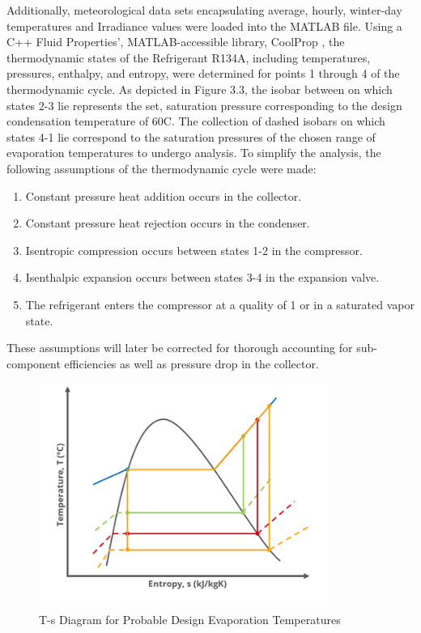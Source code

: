 \medskip
Additionally, meteorological data sets encapsulating average, hourly, winter-day temperatures and Irradiance values were loaded into the MATLAB \cite{MATLAB} file. Using a C++ Fluid Properties’, MATLAB-accessible library, CoolProp \cite{cool_prop}, the thermodynamic states of the Refrigerant R134A, including temperatures, pressures, enthalpy, and entropy, were determined for points 1 through 4 of the thermodynamic cycle. As depicted in Figure 3.3, the isobar between on which states 2-3 lie represents the set, saturation pressure corresponding to the design condensation temperature of 60\textdegree C. The collection of dashed isobars on which states 4-1 lie correspond to the saturation pressures of the chosen range of evaporation temperatures to undergo analysis. To simplify the analysis, the following assumptions of the thermodynamic cycle were made:

\begin{enumerate}[itemsep=3mm, parsep=-1mm, label=\roman*.]
    \item Constant pressure heat addition occurs in the collector.
    \item Constant pressure heat rejection occurs in the condenser.
    \item Isentropic compression occurs between states 1-2 in the compressor.
    \item Isenthalpic expansion occurs between states 3-4 in the expansion valve.
    \item The refrigerant enters the compressor at a quality of 1 or in a saturated vapor state.
\end{enumerate}

\medskip
These assumptions will later be corrected for thorough accounting for sub-component efficiencies as well as pressure drop in the collector.

\medskip
\begin{figure}[H]
    \centering
    \includegraphics[width=9.5cm]{images/ts_diagram.png}
    \caption{T-s Diagram for Probable Design Evaporation Temperatures}
\end{figure}

